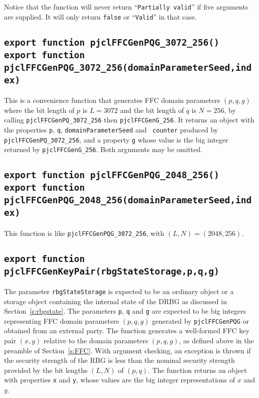\documentclass[12pt]{article}
\begin{document}
Notice that the function will never return ``{\tt Partially valid}'' if 
five arguments are supplied.  It will only return {\tt false} or ``{\tt Valid}''
in that case.

\subsection{\tt export function pjclFFCGenPQG\_3072\_256()\\export function pjclFFCGenPQG\_3072\_256(domainParameterSeed,index)}

This is a convenience function that generates FFC domain parameters $(p,q,g)$ 
where the bit length of $p$ is $L = 3072$ and the bit length of $q$ is $N = 256$,
by calling {\tt pjclFFCGenPQ\_3072\_256} then {\tt pjclFFCGenG\_256}.  It returns an object with
the properties {\tt p}, {\tt q}, {\tt domainParameterSeed} and {\tt
  counter} produced by {\tt pjclFFCGenPQ\_3072\_256}, and a property {\tt g}
whose value is the big integer returned by {\tt pjclFFCGenG\_256}.
Both arguments may be omitted.

\subsection{\tt export function pjclFFCGenPQG\_2048\_256()\\export function pjclFFCGenPQG\_2048\_256(domainParameterSeed,index)}
This function is like {\tt pjclFFCGenPQG\_3072\_256}, with $(L,N) = (2048,256)$.

\subsection{\tt export function pjclFFCGenKeyPair(rbgStateStorage,p,q,g)}

The parameter {\tt rbgStateStorage} is expected to be an ordinary
object or a storage object containing the internal state of the DRBG 
as discussed in Section~\ref{s:rbgstate}.
The parameters {\tt p}, {\tt q} and {\tt g} are expected to be big integers
representing FFC domain parameters $(p,q,g)$
generated by {\tt pjclFFCGenPQG} or obtained from an external party.
The function generates
a well-formed FFC key pair $(x,y)$ relative to the domain parameters $(p,q,g)$,
as defined above in the preamble of Section~\ref{s:FFC}.
With argument checking, an exception is thrown if the security strength
of the RBG is less than the nominal security strength provided by the
bit lengths $(L,N)$ of $(p,q)$.
The function returns an object with properties {\tt x} and {\tt y},
whose values are the big integer representations of $x$ and $y$.
\end{document}
